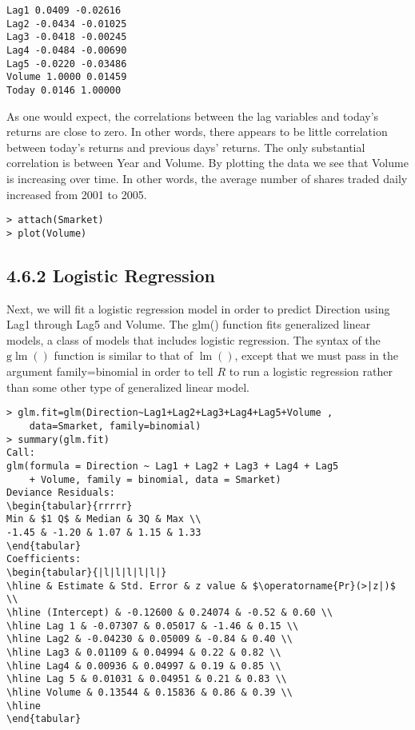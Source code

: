 \documentclass[10pt]{article}
\begin{document}
\begin{verbatim}
Lag1 0.0409 -0.02616
Lag2 -0.0434 -0.01025
Lag3 -0.0418 -0.00245
Lag4 -0.0484 -0.00690
Lag5 -0.0220 -0.03486
Volume 1.0000 0.01459
Today 0.0146 1.00000
\end{verbatim}

As one would expect, the correlations between the lag variables and today's returns are close to zero. In other words, there appears to be little correlation between today's returns and previous days' returns. The only substantial correlation is between Year and Volume. By plotting the data we see that Volume is increasing over time. In other words, the average number of shares traded daily increased from 2001 to 2005.

\begin{verbatim}
> attach(Smarket)
> plot(Volume)
\end{verbatim}

\subsection*{4.6.2 Logistic Regression}
Next, we will fit a logistic regression model in order to predict Direction using Lag1 through Lag5 and Volume. The glm() function fits generalized linear models, a class of models that includes logistic regression. The syntax of the $\mathrm{g} \operatorname{lm}()$ function is similar to that of $\operatorname{lm}()$, except that we must pass in the argument family=binomial in order to tell $R$ to run a logistic regression rather than some other type of generalized linear model.

\begin{verbatim}
> glm.fit=glm(Direction~Lag1+Lag2+Lag3+Lag4+Lag5+Volume ,
    data=Smarket, family=binomial)
> summary(glm.fit)
Call:
glm(formula = Direction ~ Lag1 + Lag2 + Lag3 + Lag4 + Lag5
    + Volume, family = binomial, data = Smarket)
Deviance Residuals:
\begin{tabular}{rrrrr} 
Min & $1 Q$ & Median & 3Q & Max \\
-1.45 & -1.20 & 1.07 & 1.15 & 1.33
\end{tabular}
Coefficients:
\begin{tabular}{|l|l|l|l|l|}
\hline & Estimate & Std. Error & z value & $\operatorname{Pr}(>|z|)$ \\
\hline (Intercept) & -0.12600 & 0.24074 & -0.52 & 0.60 \\
\hline Lag 1 & -0.07307 & 0.05017 & -1.46 & 0.15 \\
\hline Lag2 & -0.04230 & 0.05009 & -0.84 & 0.40 \\
\hline Lag3 & 0.01109 & 0.04994 & 0.22 & 0.82 \\
\hline Lag4 & 0.00936 & 0.04997 & 0.19 & 0.85 \\
\hline Lag 5 & 0.01031 & 0.04951 & 0.21 & 0.83 \\
\hline Volume & 0.13544 & 0.15836 & 0.86 & 0.39 \\
\hline
\end{tabular}
\end{verbatim}
\end{document}
